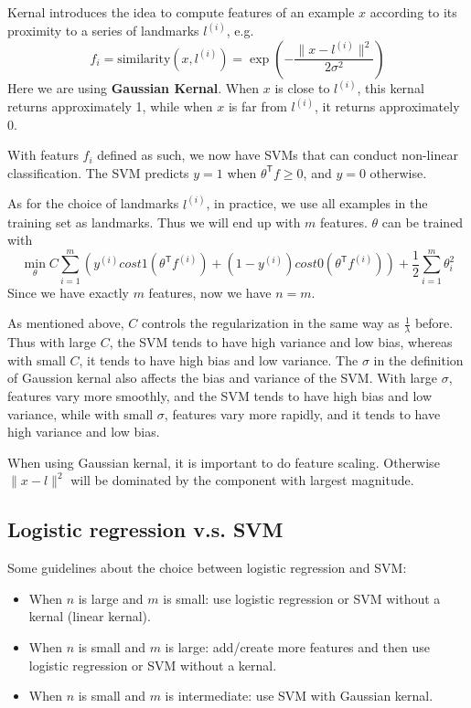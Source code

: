 Kernal introduces the idea to compute features of an example $x$ according to its proximity to a series of landmarks $l^{(i)}$, e.g.
\begin{equation}
f_i = \text{similarity}\left(x,l^{(i)}\right) = \exp\left(-\frac{\lVert x-l^{(i)}\rVert^2}{2\sigma^2}\right)
\end{equation}
Here we are using {\bf Gaussian Kernal}. When $x$ is close to $l^{(i)}$, this kernal returns approximately 1, while when $x$ is far from $l^{(i)}$, it returns approximately 0.

With featurs $f_i$ defined as such, we now have SVMs that can conduct non-linear classification. The SVM predicts $y=1$ when $\theta^{\mathsf T}f \ge 0$, and $y=0$ otherwise.

As for the choice of landmarks $l^{(i)}$, in practice, we use all examples in the training set as landmarks. Thus we will end up with $m$ features. $\theta$ can be trained with
\begin{equation}
\min\limits_{\theta}C\sum\limits_{i=1}^{m}\left(y^{(i)}cost1(\theta^{\mathsf T}f^{(i)}) + (1- y^{(i)})cost0(\theta^{\mathsf T}f^{(i)})\right) + \frac{1}{2}\sum\limits_{i=1}^{m}\theta_i^2
\end{equation}
Since we have exactly $m$ features, now we have $n=m$. 

As mentioned above, $C$ controls the regularization in the same way as $\frac{1}{\lambda}$ before. Thus with large $C$, the SVM tends to have high variance and low bias, whereas with small $C$, it tends to have high bias and low variance. The $\sigma$ in the definition of Gaussion kernal also affects the bias and variance of the SVM. With large $\sigma$, features vary more smoothly, and the SVM tends to have high bias and low variance, while with small $\sigma$, features vary more rapidly, and it tends to have high variance and low bias.

When using Gaussian kernal, it is important to do feature scaling. Otherwise $\lVert x-l\rVert^2$ will be dominated by the component with largest magnitude.
\subsection{Logistic regression v.s. SVM}
Some guidelines about the choice between logistic regression and SVM:
\begin{itemize}
\item When $n$ is large and $m$ is small: use logistic regression or SVM without a kernal (linear kernal).
\item When $n$ is small and $m$ is large: add/create more features and then use logistic regression or SVM without a kernal.
\item When $n$ is small and $m$ is intermediate: use SVM with Gaussian kernal. 
\end{itemize}

\ifx\PREAMBLE\undefined

\fi